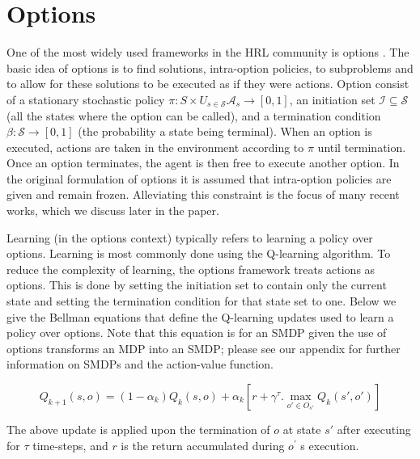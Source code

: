 \section{Options}
One of the most widely used frameworks in the HRL community is options \cite{Sutton}.
The basic idea of options is to find solutions, intra-option policies, to subproblems and to allow
for these solutions to be executed as if they were actions.
Option consist of a stationary stochastic policy \(\pi:S \times U_{s \in \mathcal{S}}  \mathcal{A}_s \rightarrow [0,1]\),
an initiation set \(\mathcal{I} \subseteq  \mathcal{S}\) (all the states where the option can be called),
and a termination condition \(\beta:\mathcal{S} \rightarrow [0,1]\) (the probability a state being terminal).
When an option is executed, actions are taken in the environment according to \(\pi\) until termination.
Once an option terminates, the agent is then free to execute another option. In the original formulation of options it
is assumed that intra-option policies are given and remain frozen. Alleviating this constraint is the focus of many
recent works, which we discuss later in the paper.

Learning (in the options context) typically refers to learning a policy over options.
Learning is most commonly done using the Q-learning algorithm. To reduce the complexity of learning,
the options framework treats actions as options. This is done by
setting the initiation set to contain only the current state and setting the termination condition
for that state set to one. Below we give the Bellman equations that define the Q-learning updates
used to learn a policy over options. Note that this equation is for an SMDP given the use of options
transforms an MDP into an SMDP; please see our appendix for further information on SMDPs and the
action-value function.

\begin{equation}
    Q_{k+1} (s,o)=(1-\alpha_k ) Q_k (s,o)+\alpha_k [r+ \gamma^\tau.   \max_{o' \in O_{s'}}⁡ Q_k (s',o' )]
\end{equation}

The above update is applied upon the termination of \(o\) at state \(s'\)
after executing for \(\tau\) time-steps, and \(r\) is the return accumulated during \(o^'\) s execution.  \\
